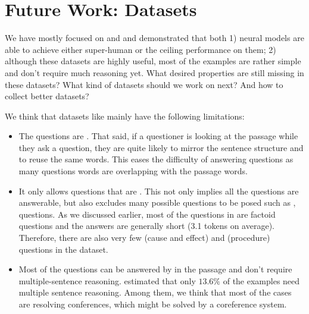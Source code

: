 
\section{Future Work: Datasets}
\label{sec:future-datasets}

We have mostly focused on  and  and demonstrated that both 1) neural models are able to achieve either super-human or the ceiling performance on them; 2) although these datasets are highly useful, most of the examples are rather simple and don't require much reasoning yet.  What desired properties are still missing in these datasets? What kind of datasets should we work on next? And how to collect better datasets?


We think that datasets like  mainly have the following limitations:
\begin{itemize}
    \item
        The questions are .  That said, if a questioner is looking at the passage while they ask a question, they are quite likely to mirror the sentence structure and to reuse the same words. This eases the difficulty of answering questions as many questions words are overlapping with the passage words.
    \item
        It only allows questions that are . This not only implies all the questions are answerable, but also excludes many possible questions to be posed such as ,  questions. As we discussed earlier, most of the questions in  are factoid questions and the answers are generally short (3.1 tokens on average). Therefore, there are also very few  (cause and effect) and  (procedure) questions in the dataset.
    \item
        Most of the questions can be answered by  in the passage and don't require multiple-sentence reasoning.  estimated that only $13.6\%$ of the examples need multiple sentence reasoning. Among them, we think that most of the cases are resolving conferences, which might be solved by a coreference system.
\end{itemize}

